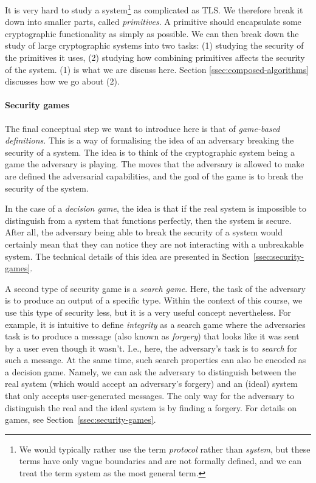 It is very hard to study a system\footnote{We would typically rather use the term \emph{protocol} rather than \emph{system}, but these terms have only vague boundaries and are not formally defined, and we can treat the term system as the most general term.} as complicated as TLS.
We therefore break it down into smaller parts, called \emph{primitives}.
A primitive should encapsulate some cryptographic functionality as simply as possible.
We can then break down the study of large cryptographic systems into two tasks: (1) studying the security of the primitives it uses, (2) studying how combining primitives affects the security of the system. (1) is what we are discuss here. Section \ref{ssec:composed-algorithms} discusses how we go about (2).

\paragraph{Security games}
The final conceptual step we want to introduce here is that of \emph{game-based definitions}.
This is a way of formalising the idea of an adversary breaking the security of a system.
The idea is to think of the cryptographic system being a game the adversary is playing.
The moves that the adversary is allowed to make are defined the adversarial capabilities, and the goal of the game is to break the security of the system.

In the case of a \emph{decision game}, the idea is that if the real system is impossible to distinguish from a system that functions perfectly, then the system is secure.
After all, the adversary being able to break the security of a system would certainly mean that they can notice they are not interacting with a unbreakable system. The technical details of this idea are presented in Section~\ref{ssec:security-games}.

A second type of security game is a \emph{search game}. Here, the task of the adversary is to produce an output of a specific type. Within the context of this course, we use this type of security less, but it is a very useful concept nevertheless. For example, it is intuitive to define \emph{integrity} as a search game where the adversaries task is to produce a message (also known as \emph{forgery}) that looks like it was sent by a user even though it wasn't. I.e., here, the adversary's task is to \emph{search} for such a message. At the same time, such search properties can also be encoded as a decision game. Namely, we can ask the adversary to distinguish between the real system (which would accept an adversary's forgery) and an (ideal) system that only accepts user-generated messages. The only way for the adversary to distinguish the real and the ideal system is by finding a forgery. For details on games, see Section~\ref{ssec:security-games}.

